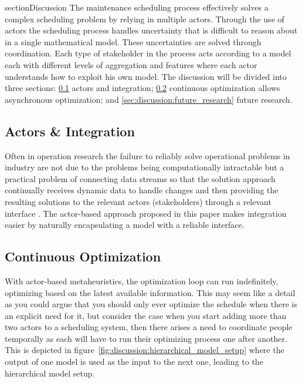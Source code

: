 section{Discussion}
\label{sec:4-discussion}
The maintenance scheduling process effectively solves a complex scheduling problem by
relying in multiple actors. Through the use of actors the scheduling process handles
uncertainty that is difficult to reason about in a single mathematical model. These 
uncertainties are solved through coordination. Each type of stakeholder in the process 
acts according to a  model each with different levels of aggregation and features where
each actor understands how to exploit his own model.
The discussion will be divided into three sections: 
\ref{sec:discussion:actors_and_integration} 
actors and integration;
\ref{sec:discussion:continuous_optimization} 
continuous optimization allows asynchronous optimization; 
and \ref{sec:discussion:future_research} future research.

\subsection{Actors \& Integration}
\label{sec:discussion:actors_and_integration}
Often in operation research the failure to reliably solve operational
problems in  industry are not due to the problems being computationally
intractable \cite{gendreauHandbookMetaheuristics2019} but a practical
problem of connecting data streams so that the solution approach continually
receives dynamic data to handle changes and then providing the resulting
solutions to the relevant actors (stakeholders) through a relevant interface
\cite{meignanReviewTaxonomyInteractive2015}. The actor-based approach proposed
in this paper makes integration easier by naturally encapsulating a model with a
reliable interface.

\subsection{Continuous Optimization}
\label{sec:discussion:continuous_optimization}
With actor-based metaheuristics, the optimization loop can run indefinitely,
optimizing based on the latest available information. This may seem like a
detail as you could argue that you should only ever optimize the schedule
when there is an explicit need for it, but consider the case when you start
adding more than two actors to a scheduling system, then there arises a need
to coordinate people temporally as each will have to run their optimizing
process one after another. This is depicted in figure~\ref{fig:discussion:hierarchical_model_setup}
where the output of one model is used as the input to the next one, leading
to the hierarchical model setup.


